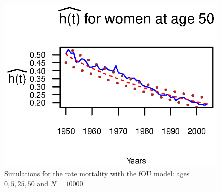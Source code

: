 \documentclass[smallextended]{svjour3}
\begin{document}
\begin{figure}[H]
    \includegraphics{PlotWomen50.eps}
    \caption{Simulations for the rate mortality with the fOU model: ages
    $0,5,25,50$ and $N=10000$.}
    \label{graph-simu_FOU1}
\end{figure}

\end{document}
